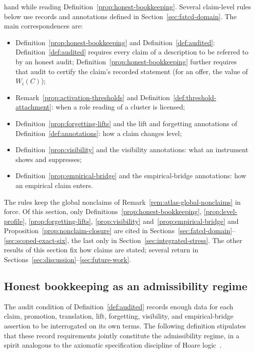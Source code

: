 hand while reading Definition~\ref{prop:honest-bookkeeping}. Several claim-level rules
below use records and annotations defined in
Section~\ref{sec:fatcd-domain}. The main correspondences are:
\begin{itemize}[topsep=2pt,itemsep=1pt]
  \item Definition~\ref{prop:honest-bookkeeping} and
    Definition~\ref{def:audited}: Definition~\ref{def:audited} requires every
    claim of a description to be referred to by an honest audit;
    Definition~\ref{prop:honest-bookkeeping} further requires that audit to
    certify the claim's recorded statement (for an offer, the value of
    \(W_i(C)\));
  \item Remark~\ref{prop:activation-thresholds} and
    Definition~\ref{def:threshold-attachment}: when a role reading of a
    cluster is licensed;
  \item Definition~\ref{prop:forgetting-lifts} and the lift and forgetting
    annotations of Definition~\ref{def:annotations}: how a claim changes
    level;
  \item Definition~\ref{prop:visibility} and the visibility annotations:
    what an instrument shows and suppresses;
  \item Definition~\ref{prop:empirical-bridge} and the empirical-bridge
    annotations: how an empirical claim enters.
\end{itemize} The rules keep the global
nonclaims of Remark~\ref{rem:atlas-global-nonclaims} in force. Of this section, only
Definitions~\ref{prop:honest-bookkeeping}, \ref{prop:level-profile},
\ref{prop:forgetting-lifts}, \ref{prop:visibility}
and~\ref{prop:empirical-bridge} and Proposition~\ref{prop:nonclaim-closure}
are cited in Sections~\ref{sec:fatcd-domain}--\ref{sec:scoped-exact-six}, the
last only in Section~\ref{sec:integrated-stress}. The other results of this section
fix how claims are stated; several return in
Sections~\ref{sec:discussion}--\ref{sec:future-work}.

\subsection{Honest bookkeeping as an admissibility regime}\label{subsec:honest-bookkeeping}

The audit condition of Definition~\ref{def:audited} records enough
data for each claim, promotion, translation, lift, forgetting,
visibility, and empirical-bridge assertion to be interrogated on its
own terms. The following definition stipulates that these record
requirements jointly constitute the admissibility regime, in a spirit
analogous to the axiomatic specification discipline of Hoare
logic~\citep{Hoare1969}.

